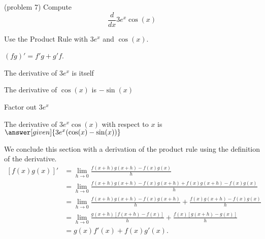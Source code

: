 \documentclass{ximera}
\begin{document}
\begin{problem}(problem 7)
  Compute
  \[
  \frac{d}{dx} 3e^x \cos(x)
  \]
  
    \begin{hint}
      Use the Product Rule with $3e^x$ and $\cos(x)$.
    \end{hint}
    \begin{hint}
      $(fg)' = f'g+g'f$.
    \end{hint}
    \begin{hint}
      The derivative of $3e^x$ is itself
    \end{hint}
    \begin{hint}
      The derivative of $\cos(x)$ is $-\sin(x)$
    \end{hint}
		\begin{hint}
      Factor out $3e^x$
    \end{hint}
		The derivative of $3e^x\cos(x)$ with respect to $x$ is
		 $\answer[given]{3e^x(\cos(x) - \sin(x))}$
		
\end{problem}




\begin{center}
\begin{foldable}
\end{foldable}
\end{center}

We conclude this section with a derivation of the product rule using the definition of the derivative.
\begin{align*}
\left[f(x)g(x)\right]' &= \lim_{h \to 0} \frac{f(x+h)g(x+h)-f(x)g(x)}{h}\\[5pt] 
&= \lim_{h \to 0} \frac{f(x+h)g(x+h)- f(x)g(x+h) + f(x)g(x+h) - f(x)g(x)}{h}\\[5pt] 
&= \lim_{h \to 0} \frac{f(x+h)g(x+h)- f(x)g(x+h)}{h} + \frac{f(x)g(x+h) - f(x)g(x)}{h} \\[5pt] 
&=  \lim_{h \to 0} \frac{g(x+h)\left[f(x+h)- f(x)\right]}{h} + \frac{f(x)\left[g(x+h) - g(x)\right]}{h}\\[5pt] 
&= g(x)f'(x) + f(x)g'(x).
\end{align*}
\end{document}

